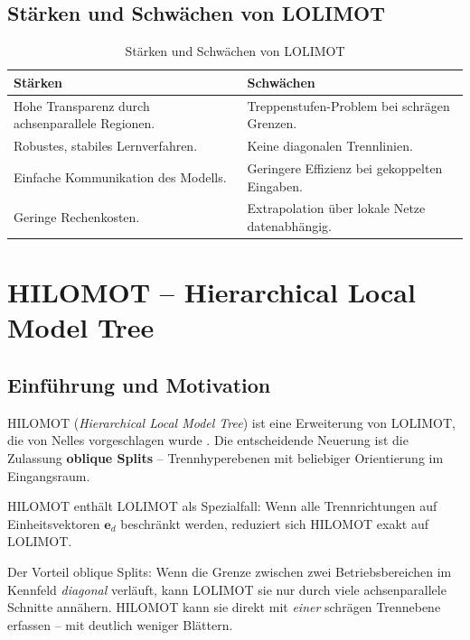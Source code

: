 \documentclass[11pt,a4paper]{report}
\begin{document}
\section{St\"{a}rken und Schw\"{a}chen von LOLIMOT}

\begin{table}[H]
\centering
\caption{St\"{a}rken und Schw\"{a}chen von LOLIMOT}
\label{tab:lolimot_pros_cons}
\begin{tabular}{p{6.5cm}p{6.5cm}}
\toprule
\textbf{St\"{a}rken} & \textbf{Schw\"{a}chen} \\
\midrule
Hohe Transparenz durch achsenparallele Regionen. & Treppenstufen-Problem bei schr\"{a}gen Grenzen. \\
Robustes, stabiles Lernverfahren. & Keine diagonalen Trennlinien. \\
Einfache Kommunikation des Modells. & Geringere Effizienz bei gekoppelten Eingaben. \\
Geringe Rechenkosten. & Extrapolation \"{u}ber lokale Netze datenabh\"{a}ngig. \\
\bottomrule
\end{tabular}
\end{table}

\chapter{HILOMOT -- Hierarchical Local Model Tree}

\section{Einf\"{u}hrung und Motivation}

HILOMOT (\emph{Hierarchical Local Model Tree}) ist eine Erweiterung von LOLIMOT, die von Nelles
vorgeschlagen wurde \cite{nelles2001}. Die entscheidende Neuerung ist die Zulassung
\textbf{oblique Splits} -- Trennhyperebenen mit beliebiger Orientierung im Eingangsraum.

\begin{merkbox}
HILOMOT enth\"{a}lt LOLIMOT als Spezialfall: Wenn alle Trennrichtungen auf Einheitsvektoren
$\mathbf{e}_d$ beschr\"{a}nkt werden, reduziert sich HILOMOT exakt auf LOLIMOT.
\end{merkbox}

Der Vorteil oblique Splits: Wenn die Grenze zwischen zwei Betriebsbereichen im
Kennfeld \emph{diagonal} verl\"{a}uft, kann LOLIMOT sie nur durch viele achsenparallele
Schnitte ann\"{a}hern. HILOMOT kann sie direkt mit \emph{einer} schr\"{a}gen Trennebene erfassen
-- mit deutlich weniger Bl\"{a}ttern.
\end{document}
